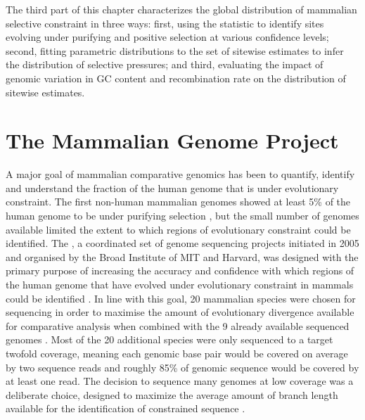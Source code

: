 The third part of this chapter characterizes the global distribution
of mammalian selective constraint in three ways: first, using the \slr
statistic to identify sites evolving under purifying and positive
selection at various confidence levels; second, fitting parametric
distributions to the set of sitewise estimates to infer the
distribution of selective pressures; and third, evaluating the impact
of genomic variation in GC content and recombination rate on the
distribution of sitewise estimates.

\section{The Mammalian Genome Project}

A major goal of mammalian comparative genomics has been to quantify,
identify and understand the fraction of the human genome that is under
evolutionary constraint. The first non-human mammalian genomes showed
at least 5\% of the human genome to be under purifying selection
\citep{Mouse2002Initial,Rat2004Genome,LindbladToh2005Genome}, but the
small number of genomes available limited the extent to which regions
of evolutionary constraint could be identified. The \mgp, a
coordinated set of genome sequencing projects initiated in 2005 and
organised by the Broad Institute of MIT and Harvard, was designed with
the primary purpose of increasing the accuracy and confidence with
which regions of the human genome that have evolved under evolutionary
constraint in mammals could be identified \citep{Margulies2007}. In
line with this goal, 20 mammalian species were chosen for sequencing
in order to maximise the amount of evolutionary divergence available
for comparative analysis when combined with the 9 already available
sequenced genomes \citep{Margulies2005Initial}. Most of the 20
additional species were only sequenced to a target twofold coverage,
meaning each genomic base pair would be covered on average by two
sequence reads and roughly 85\% of genomic sequence would be covered
by at least one read. The decision to sequence many genomes at low
coverage was a deliberate choice, designed to maximize the average
amount of branch length available for the identification of
constrained sequence \citep{Margulies2007}.

